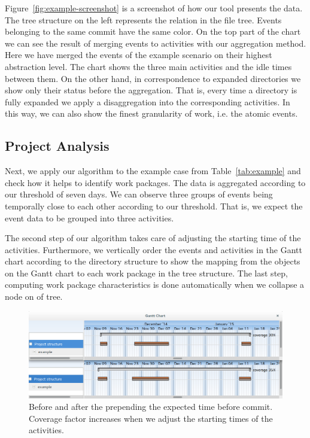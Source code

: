 Figure~\ref{fig:example-screenshot} is a screenshot of how our tool presents the data. The tree structure on the left represents the \parent relation in the file tree. Events belonging to the same commit have the same color. On the top part of the chart we can see the result of merging events to activities with our aggregation method. Here we have merged the events of the example scenario on their highest abstraction level. The chart shows the three main activities and the idle times between them. %
On the other hand, in correspondence to expanded directories we show only their status before the aggregation. That is, every time a directory is fully expanded we apply a disaggregation into the corresponding activities. In this way, we can also show the finest granularity of work, i.e. the atomic events.

\subsection{Project Analysis}
Next, we apply our algorithm to the example case from Table~\ref{tab:example} and check how it helps to identify work packages. The data is aggregated according to our threshold of seven days. We can observe three groups of events being temporally close to each other according to our threshold. That is, we expect the event data to be grouped into three activities.

The second step of our algorithm takes care of adjusting the starting time of the activities. Furthermore, we vertically order the events and activities in the Gantt chart according to the directory structure to show the mapping from the objects on the Gantt chart to each work package in the tree structure. The last step, computing work package characteristics is done automatically when we collapse a node on of tree.

\begin{figure}
\centering
\includegraphics[width=\textwidth]{bpm2015/imgs/coverage_before_and_after}
\caption{Before and after the prepending the expected time before commit. Coverage factor increases when we adjust the starting times of the activities.}
\label{fig:example-collapsed}
\end{figure}

